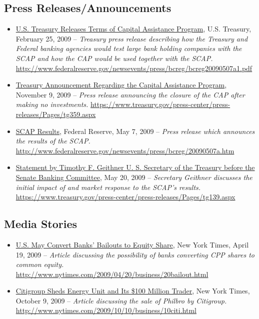 \documentclass[12pt]{article}
\begin{document}
\subsection{Press Releases/Announcements}

\begin{itemize}
\item
\ul{U.S. Treasury Releases Terms of Capital Assistance Program}, U.S. Treasury, February 25, 2009 -- \emph{Treasury press release describing how the Treasury and Federal banking agencies would test large bank holding companies with the SCAP and how the CAP would be used together with the SCAP.} \url{http://www.federalreserve.gov/newsevents/press/bcreg/bcreg20090507a1.pdf}
\item
\ul{Treasury Announcement Regarding the Capital Assistance Program}, November 9, 2009 -- \emph{Press release announcing the closure of the CAP after making no investments.} \url{https://www.treasury.gov/press-center/press-releases/Pages/tg359.aspx}
\item
\ul{SCAP
 Results}, Federal Reserve, May 7, 2009 -- \emph{Press release which
 announces the results of the SCAP.} \url{http://www.federalreserve.gov/newsevents/press/bcreg/20090507a.htm}
\item
\ul{Statement
 by Timothy F. Geithner U. S. Secretary of the Treasury before the
 Senate Banking Committee}, May 20, 2009 -- \emph{Secretary Geithner
 discusses the initial impact of and market response to the SCAP's
 results.} \url{https://www.treasury.gov/press-center/press-releases/Pages/tg139.aspx}
\end{itemize}

\subsection{Media Stories}

\begin{itemize}
\item
\ul{U.S. May Convert Banks' Bailouts to Equity Share}, New York Times, April 19,
 2009 -- \emph{Article discussing the possibility of banks converting CPP shares to common equity.} \url{http://www.nytimes.com/2009/04/20/business/20bailout.html}
\item
\ul{Citigroup Sheds Energy Unit and Its \$100 Million Trader}, New York Times, October 9,
 2009 -- \emph{Article discussing the sale of Philbro by Citigroup.} \url{http://www.nytimes.com/2009/10/10/business/10citi.html}
\end{itemize}
\end{document}
